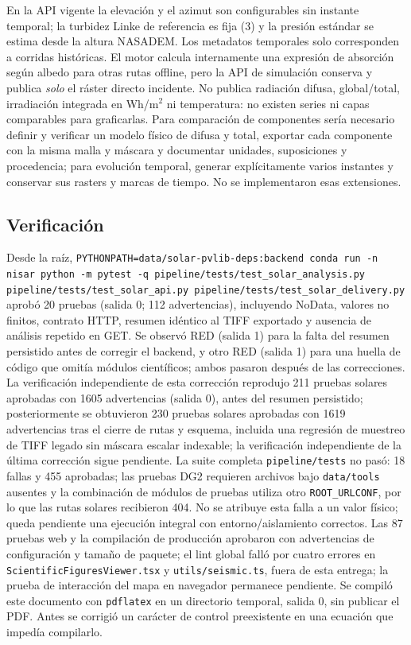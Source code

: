 \documentclass[11pt,a4paper]{article}
\begin{document}
En la API vigente la elevación y el azimut son configurables sin instante temporal; la turbidez Linke de referencia es fija (3) y la presión estándar se estima desde la altura NASADEM. Los metadatos temporales solo corresponden a corridas históricas. El motor calcula internamente una expresión de absorción según albedo para otras rutas offline, pero la API de simulación conserva y publica \emph{solo} el ráster directo incidente. No publica radiación difusa, global/total, irradiación integrada en Wh/m$^2$ ni temperatura: no existen series ni capas comparables para graficarlas. Para comparación de componentes sería necesario definir y verificar un modelo físico de difusa y total, exportar cada componente con la misma malla y máscara y documentar unidades, suposiciones y procedencia; para evolución temporal, generar explícitamente varios instantes y conservar sus rasters y marcas de tiempo. No se implementaron esas extensiones.

\subsection{Verificación}
Desde la raíz, \texttt{PYTHONPATH=data/solar-pvlib-deps:backend conda run -n nisar python -m pytest -q pipeline/tests/test\_solar\_analysis.py pipeline/tests/test\_solar\_api.py pipeline/tests/test\_solar\_delivery.py} aprobó 20 pruebas (salida 0; 112 advertencias), incluyendo NoData, valores no finitos, contrato HTTP, resumen idéntico al TIFF exportado y ausencia de análisis repetido en GET. Se observó RED (salida 1) para la falta del resumen persistido antes de corregir el backend, y otro RED (salida 1) para una huella de código que omitía módulos científicos; ambos pasaron después de las correcciones. La verificación independiente de esta corrección reprodujo 211 pruebas solares aprobadas con 1605 advertencias (salida 0), antes del resumen persistido; posteriormente se obtuvieron 230 pruebas solares aprobadas con 1619 advertencias tras el cierre de rutas y esquema, incluida una regresión de muestreo de TIFF legado sin máscara escalar indexable; la verificación independiente de la última corrección sigue pendiente. La suite completa \texttt{pipeline/tests} no pasó: 18 fallas y 455 aprobadas; las pruebas DG2 requieren archivos bajo \texttt{data/tools} ausentes y la combinación de módulos de pruebas utiliza otro \texttt{ROOT\_URLCONF}, por lo que las rutas solares recibieron 404. No se atribuye esta falla a un valor físico; queda pendiente una ejecución integral con entorno/aislamiento correctos. Las 87 pruebas web y la compilación de producción aprobaron con advertencias de configuración y tamaño de paquete; el lint global falló por cuatro errores en \texttt{ScientificFiguresViewer.tsx} y \texttt{utils/seismic.ts}, fuera de esta entrega; la prueba de interacción del mapa en navegador permanece pendiente. Se compiló este documento con \texttt{pdflatex} en un directorio temporal, salida 0, sin publicar el PDF. Antes se corrigió un carácter de control preexistente en una ecuación que impedía compilarlo.
\end{document}
